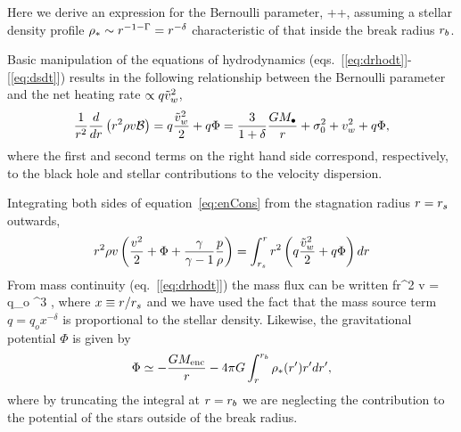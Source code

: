 Here we derive an expression for the Bernoulli parameter, 
\be
{} \equiv \ke
+\gammaf {}+\Phi,
\ee
assuming a stellar density profile $\rho_*\sim r^{-1-\Gamma}=r^{-\delta}$ characteristic of that inside the break radius $r_b$.

Basic manipulation of the equations of hydrodynamics (eqs.~[\ref{eq:drhodt}]-[\ref{eq:dsdt}]) results in the following relationship between the Bernoulli parameter and the net heating rate $\propto q \tilde{v}_{w}^{2}$,
\begin{align}
\frac{1}{r^2} \frac{d}{dr} \left(r^2 \rho v \mathcal{B} \right) = q \frac{\tilde{v}_{w}^2}{2} + q \Phi = \frac{3}{1+\delta}\frac{G
  M_{\bullet}}{r}+\sigma_0^2+v_w^2 + q \Phi,
\label{eq:enCons}
\end{align}
where the first and second terms on the right hand side correspond, respectively, to the black hole and stellar contributions to the velocity dispersion.

Integrating both sides of equation~\eqref{eq:enCons} from the stagnation radius $r = r_s$ outwards,
\begin{align}
  r^2 \rho v \left(\frac{v^2}{2}+\Phi+\frac{\gamma}{\gamma-1} \frac{p}{\rho} \right)= \int_{r_s}^{r}
    r^2 \left(q \frac{\tilde{v}_{w}^2}{2} + q\Phi\right) dr
    \label{eq:enConsInt}
\end{align}
From mass continuity (eq.~[\ref{eq:drhodt}]) the mass flux can be written
\be
 f\equiv r^2 \rho v = q_o \rs^3 ,
 \label{eq:massFlux}
\ee
where $x \equiv r/r_s$ and we have used the fact that the mass source term $q = q_o x^{-\delta}$ is proportional to the stellar density.  Likewise, the gravitational potential $\Phi$ is given by
\begin{align}
\Phi \simeq -\frac{G M_{\rm enc}}{r} -4 \pi G \int_{r}^{r_b} \rho_*(r') r' dr',
\label{eq:Phi}
\end{align}
where by truncating the integral at $r = r_b$ we are neglecting the contribution to the potential of the stars outside of the break radius.

